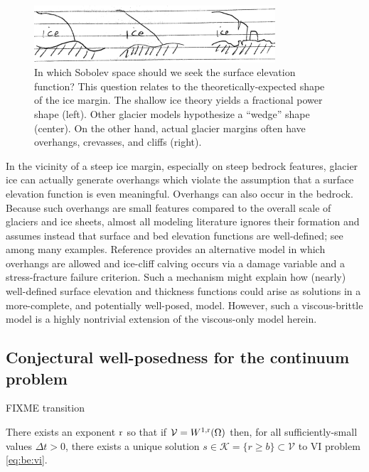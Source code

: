 \documentclass[hidelinks,onefignum,onetabnum,final]{siamart220329}  %
\newcommand{\cK}{\mathcal{K}}
\newcommand{\cV}{\mathcal{V}}
\newcommand{\rr}{{\text{\textnormal{r}}}}
\begin{document}
\begin{figure}
\begin{center}
\includegraphics[width=0.8\textwidth]{figs/margins.jpg}
\end{center}
\caption{In which Sobolev space should we seek the surface elevation function?  This question relates to the theoretically-expected shape of the ice margin.  The shallow ice theory yields a fractional power shape (left).  Other glacier models hypothesize a ``wedge'' shape (center).  On the other hand, actual glacier margins often have overhangs, crevasses, and cliffs (right).} %
\label{fig:margins}
\end{figure}

In the vicinity of a steep ice margin, especially on steep bedrock features, glacier ice can actually generate overhangs which violate the assumption that a surface elevation function is even meaningful.  Overhangs can also occur in the bedrock.  Because such overhangs are small features compared to the overall scale of glaciers and ice sheets, almost all modeling literature ignores their formation and assumes instead that surface and bed elevation functions are well-defined; see \cite{IsaacStadlerGhattas2015,Jouvetetal2008,LofgrenAhlkronaHelanow2022,WirbelJarosch2020} among many examples.  Reference \cite{PralongFunk2005} provides an alternative model in which overhangs are allowed and ice-cliff calving occurs via a damage variable and a stress-fracture failure criterion.  Such a mechanism might explain how (nearly) well-defined surface elevation and thickness functions could arise as solutions in a more-complete, and potentially well-posed, model.  However, such a viscous-brittle model is a highly nontrivial extension of the viscous-only model herein.

\subsection{Conjectural well-posedness for the continuum problem} \label{subsec:conjecture} FIXME transition

\begin{conjecture} \label{conj:wellposed:be}
There exists an exponent $\rr$ so that if $\cV = W^{1,\rr}(\Omega)$ then, for all sufficiently-small values $\Delta t>0$, there exists a unique solution $s \in \cK = \{r\ge b\} \subset \cV$ to VI problem \eqref{eq:be:vi}.
\end{conjecture}
\end{document}
